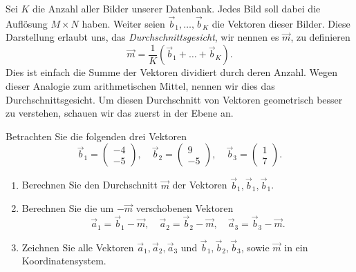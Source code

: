 Sei $K$ die Anzahl aller Bilder unserer Datenbank.
Jedes Bild soll dabei die Auflösung $M\times N$ haben.
Weiter seien $\vec b_1,\ldots,\vec b_K$ die Vektoren dieser Bilder.
Diese Darstellung erlaubt uns, das \textit{Durchschnittsgesicht}, wir nennen es $\vec m$, zu definieren
\begin{equation*}
	\vec m=\frac{1}{K}\left(\vec b_1+\ldots+\vec b_K\right).
\end{equation*}
Dies ist einfach die Summe der Vektoren dividiert durch deren Anzahl.
Wegen dieser Analogie zum arithmetischen Mittel, nennen wir dies das Durchschnittsgesicht.
Um diesen Durchschnitt von Vektoren geometrisch besser zu verstehen, schauen wir das zuerst in der Ebene an.
\begin{aufgabe} \label{aufg:meandiff_simple}
	Betrachten Sie die folgenden drei Vektoren
	\begin{equation*}
		\vec{b}_1=
		\begin{pmatrix}
			-4 \\
			-5
		\end{pmatrix},\quad
		\vec{b}_2=
		\begin{pmatrix}
			9 \\
			-5
		\end{pmatrix},\quad
		\vec{b}_3=
		\begin{pmatrix}
			1 \\
			7
		\end{pmatrix}.
	\end{equation*}
	\begin{enumerate}[label=(\alph*)]
		\item Berechnen Sie den Durchschnitt $\vec{m}$ der Vektoren $\vec{b}_1,\vec{b}_1,\vec{b}_1$.
		\item Berechnen Sie die um $-\vec{m}$ verschobenen Vektoren
		\begin{equation*}
			\vec{a}_1=\vec{b}_1-\vec{m},\quad
			\vec{a}_2=\vec{b}_2-\vec{m},\quad
			\vec{a}_3=\vec{b}_3-\vec{m}.
		\end{equation*}
		\item Zeichnen Sie alle Vektoren $\vec{a}_1,\vec{a}_2,\vec{a}_3$ und $\vec{b}_1,\vec{b}_2,\vec{b}_3$, sowie $\vec{m}$ in ein Koordinatensystem.
	\end{enumerate}
\end{aufgabe}
